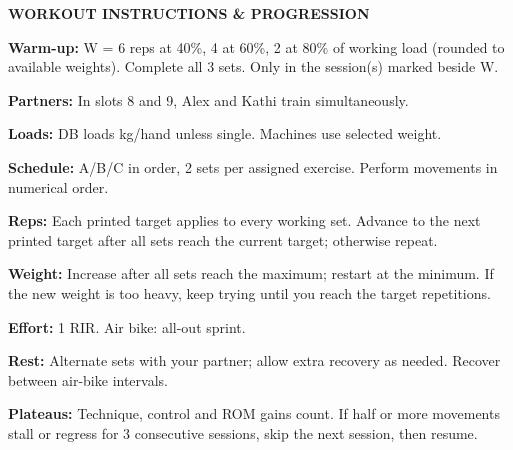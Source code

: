 \documentclass[10pt,a4paper]{article}
\begin{document}
\begin{tcolorbox}[colback=panelbg,colframe=grid,boxrule=0.5pt,arc=1.5mm,left=2mm,right=2mm,top=1.7mm,bottom=1.7mm,boxsep=0pt,before skip=0pt,after skip=0pt]
\textbf{WORKOUT INSTRUCTIONS \& PROGRESSION}\par\vspace{1.0mm}
\begin{minipage}[t]{0.485\linewidth}\raggedright
\textbf{Warm-up:} W = 6 reps at 40\%, 4 at 60\%, 2 at 80\% of working load (rounded to available weights). Complete all 3 sets. Only in the session(s) marked beside W.\par\vspace{0.8mm}
\textbf{Partners:} In slots 8 and 9, Alex and Kathi train simultaneously.\par\vspace{0.8mm}
\textbf{Loads:} DB loads kg/hand unless single. Machines use selected weight.\par\vspace{0.8mm}
\textbf{Schedule:} A/B/C in order, 2 sets per assigned exercise. Perform movements in numerical order.\par\vspace{0.8mm}
\textbf{Reps:} Each printed target applies to every working set. Advance to the next printed target after all sets reach the current target; otherwise repeat.
\end{minipage}\hfill
\begin{minipage}[t]{0.485\linewidth}\raggedright
\textbf{Weight:} Increase after all sets reach the maximum; restart at the minimum. If the new weight is too heavy, keep trying until you reach the target repetitions.\par\vspace{0.8mm}
\textbf{Effort:} 1 RIR. Air bike: all-out sprint.\par\vspace{0.8mm}
\textbf{Rest:} Alternate sets with your partner; allow extra recovery as needed. Recover between air-bike intervals.\par\vspace{0.8mm}
\textbf{Plateaus:} Technique, control and ROM gains count. If half or more movements stall or regress for 3 consecutive sessions, skip the next session, then resume.
\end{minipage}
\end{tcolorbox}
\end{document}

